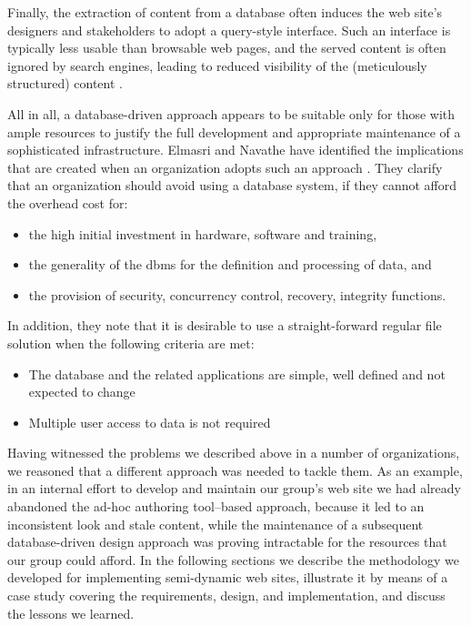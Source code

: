 \documentclass{elsart}
\begin{document}
Finally, the extraction of content from a database often
induces the web site's designers and stakeholders to adopt a
query-style interface.
Such an interface is typically less usable than browsable web pages,
and the served content is often ignored by search engines,
leading to reduced visibility
of the (meticulously structured) content \cite{DEEP_WEB,JP04}.

All in all, a database-driven approach appears to be suitable
only for those with ample resources to justify the full
development and appropriate maintenance of a sophisticated infrastructure.
Elmasri and Navathe have identified the implications that are created when an organization
adopts such an approach \cite{EN00}. They clarify that an organization should avoid
using a database system, if they cannot afford the overhead cost for:

\begin{itemize}
	\item the high initial investment in hardware, software and training,

	\item the generality of the {\sc dbms} for the definition and processing of data, and

	\item the provision of security, concurrency control, recovery, integrity functions.
\end{itemize}

In addition, they note that it is desirable to use a straight-forward regular file solution when the following criteria are met:

\begin{itemize}
	\item The database and the related applications are simple, well defined and not expected to change

	\item Multiple user access to data is not required
\end{itemize}

Having witnessed the problems we described above in a number of organizations,
we reasoned that a different approach was needed to tackle them.
As an example,
in an internal effort to develop and maintain our group's web site
we had already abandoned the ad-hoc authoring tool--based approach,
because it led to an inconsistent look and stale content,
while the maintenance of a subsequent database-driven
design approach was proving intractable for the resources that
our group could afford.
In the following sections we describe the methodology we developed
for implementing semi-dynamic web sites,
illustrate it by means
of a case study covering the requirements, design, and implementation,
and discuss the lessons we learned.
\end{document}
